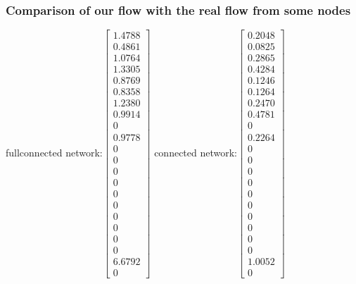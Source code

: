 \documentclass[11pt]{article}
\begin{document}
\subsubsection{Comparison of our flow with the real flow from some nodes}
fullconnected network:$\begin{bmatrix}
    1.4788\\
    0.4861\\
    1.0764\\
    1.3305\\
    0.8769\\
    0.8358\\
    1.2380\\
    0.9914\\
         0\\
    0.9778\\
         0\\
         0\\
         0\\
         0\\
         0\\
         0\\
         0\\
         0\\
         0\\
         0\\
    6.6792\\
         0
\end{bmatrix}$
connected network:$\begin{bmatrix}
    0.2048\\
    0.0825\\
    0.2865\\
    0.4284\\
    0.1246\\
    0.1264\\
    0.2470\\
    0.4781\\
         0\\
    0.2264\\
         0\\
         0\\
         0\\
         0\\
         0\\
         0\\
         0\\
         0\\
         0\\
         0\\
    1.0052\\
         0

\end{bmatrix}$
\end{document}
